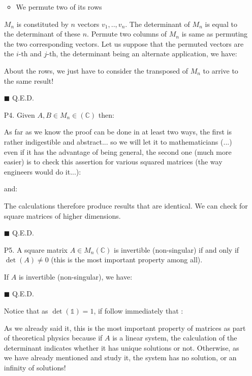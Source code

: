\begin{enumerate}
\begin{itemize}
			\item We permute two of its rows
		\end{itemize}
		\begin{dem}
		$M_n$ is constituted by $n$ vectors $v_1,..,v_n$. The determinant of $M_n$ is equal to the determinant of these $n$. Permute two columns of $M_n$ is same as permuting the two corresponding vectors. Let us suppose that the permuted vectors are the $i$-th and $j$-th, the determinant being an alternate application, we have:
		
	About the rows, we just have to consider the transposed of $M_n$ to arrive to the same result!
		\begin{flushright}
			$\blacksquare$  Q.E.D.
		\end{flushright}
		\end{dem}
		
		\item[P4.] Given $A,B\in M_n\in (\mathbb{C})$ then:\label{determinant product}
		
		As far as we know the proof can be done in at least two ways, the first is rather indigestible and abstract... so we will let it to mathematicians (...) even if it has the advantage of being general, the second one (much more easier) is to check this assertion for various squared matrices (the way engineers would do it...):
		\begin{dem}
		
		and:
		
		The calculations therefore produce results that are identical. We can check for square matrices of higher dimensions.
		\begin{flushright}
			$\blacksquare$  Q.E.D.
		\end{flushright}
		\end{dem}
		
		\item[P5.] A square matrix $A\in M_n(\mathbb{C})$ is invertible (non-singular) if and only if $\det(A)\neq 0$ (this is the most important property among all).
		\begin{dem}
		If $A$ is invertible (non-singular), we have:
		
		\begin{flushright}
			$\blacksquare$  Q.E.D.
		\end{flushright}
		\end{dem}
		Notice that as $\det(\mathds{1})=1$, if follow immediately that \label{inverse determinant}:
		
		As we already said it, this is the most important property of matrices as part of theoretical physics because if $A$ is a linear system, the calculation of the determinant indicates whether it has unique solutions or not. Otherwise, as we have already mentioned and study it, the system has no solution, or an infinity of solutions!
		

\end{enumerate}
